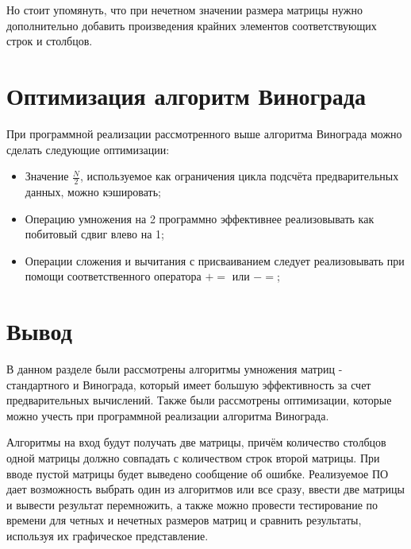 Но стоит упомянуть, что при нечетном значении размера матрицы нужно дополнительно добавить произведения крайних элементов соответствующих строк и столбцов.

\section{Оптимизация алгоритм Винограда}

При программной реализации рассмотренного выше алгоритма Винограда можно сделать следующие оптимизации:
\begin{itemize}[]
	\item Значение $\frac{N}{2}$, используемое как ограничения цикла подсчёта предварительных данных, можно кэшировать;
	\item Операцию умножения на 2 программно эффективнее реализовывать как побитовый сдвиг влево на 1;
	\item Операции сложения и вычитания с присваиванием следует реализовывать при помощи соответственного оператора $+=$ или $-=$;
 \end{itemize}


\section{Вывод}

В данном разделе были рассмотрены алгоритмы умножения матриц - стандартного и Винограда, который имеет большую эффективность за счет предварительных вычислений. Также были рассмотрены оптимизации, которые можно учесть при программной реализации алгоритма Винограда.

Алгоритмы на вход будут получать две матрицы, причём количество столбцов одной матрицы должно совпадать с количеством строк второй матрицы. При вводе пустой матрицы будет выведено сообщение об ошибке. Реализуемое ПО дает возможность выбрать один из алгоритмов или все сразу, ввести две матрицы и вывести результат перемножить, а также можно провести тестирование по времени для четных и нечетных размеров матриц и сравнить результаты, используя их графическое представление.
